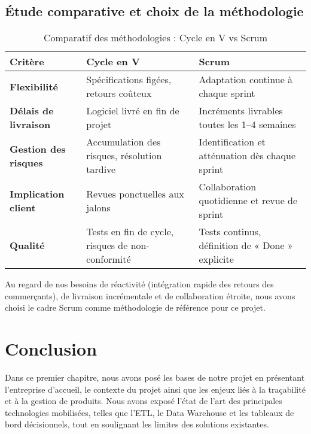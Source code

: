 \documentclass[12pt,a4paper]{report}
\begin{document}
\subsection{Étude comparative et choix de la méthodologie}
\begin{table}[H]
  \centering
  \begin{tabular}{|>{\bfseries}p{3.5cm}|p{5cm}|p{5cm}|}
    \hline
    \rowcolor{lightblue!70}
    Critère & Cycle en V & Scrum \\
    \hline
    Flexibilité &
      Spécifications figées, retours coûteux & 
      Adaptation continue à chaque sprint \\
    \hline
    Délais de livraison &
      Logiciel livré en fin de projet & 
      Incréments livrables toutes les 1–4 semaines \\
    \hline
    Gestion des risques &
      Accumulation des risques, résolution tardive & 
      Identification et atténuation dès chaque sprint \\
    \hline
    Implication client &
      Revues ponctuelles aux jalons & 
      Collaboration quotidienne et revue de sprint \\
    \hline
    Qualité &
      Tests en fin de cycle, risques de non-conformité & 
      Tests continus, définition de « Done » explicite \\
    \hline
  \end{tabular}
  \caption{Comparatif des méthodologies : Cycle en V vs Scrum}
  \label{tab:comparatif-metho}
\end{table}

Au regard de nos besoins de réactivité (intégration rapide des retours des commerçants), de livraison incrémentale et de collaboration étroite, nous avons choisi le cadre Scrum comme méthodologie de référence pour ce projet.

\section*{Conclusion}
Dans ce premier chapitre, nous avons posé les bases de notre projet en présentant l’entreprise d’accueil, le contexte du projet ainsi que les enjeux liés à la traçabilité et à la gestion de produits. Nous avons exposé l’état de l’art des principales technologies mobilisées, telles que l’ETL, le Data Warehouse et les tableaux de bord décisionnels, tout en soulignant les limites des solutions existantes.
\end{document}
